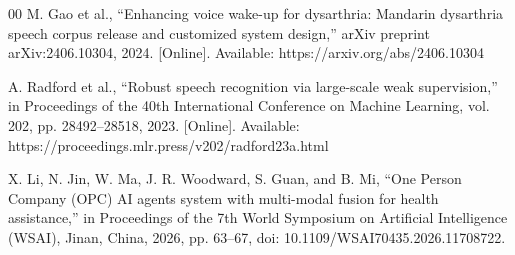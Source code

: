 \documentclass[conference]{IEEEtran}
\begin{document}
\begin{thebibliography}{00}
M. Gao et al.,
``Enhancing voice wake-up for dysarthria: Mandarin dysarthria speech corpus release and customized system design,''
arXiv preprint arXiv:2406.10304, 2024.
[Online]. Available: https://arxiv.org/abs/2406.10304

A. Radford et al.,
``Robust speech recognition via large-scale weak supervision,''
in Proceedings of the 40th International Conference on Machine Learning,
vol. 202, pp. 28492--28518, 2023.
[Online]. Available: https://proceedings.mlr.press/v202/radford23a.html

X. Li, N. Jin, W. Ma, J. R. Woodward, S. Guan, and B. Mi,
``One Person Company (OPC) AI agents system with multi-modal fusion for health assistance,''
in Proceedings of the 7th World Symposium on Artificial Intelligence (WSAI),
Jinan, China, 2026, pp. 63--67,
doi: 10.1109/WSAI70435.2026.11708722.




\end{thebibliography}


\end{document}
